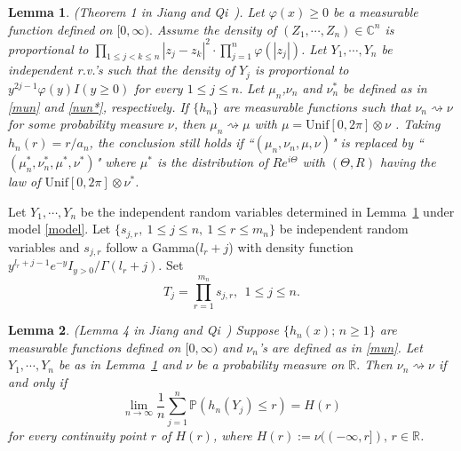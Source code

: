 \documentclass[11pt]{article}
\newtheorem{lemma}{\textbf{Lemma}}[section]
\numberwithin{equation}{section}
\begin{document}
\begin{lemma}\label{nonlinear} (Theorem 1 in Jiang and Qi~\cite{JiangQi2019}). Let $\varphi(x)\geq 0$ be a measurable  function defined on $[0, \infty).$ Assume the density  of $(Z_1, \cdots, Z_n)\in \mathbb{C}^n$ is proportional to  $\prod_{1\leq j < k
\leq n}|z_j-z_k|^2\cdot \prod_{j=1}^n\varphi(|z_j|)$. Let $Y_1,
\cdots, Y_n$ be independent r.v.'s such that the density of $Y_j$ is
proportional to  $y^{2j-1}\varphi(y)I(y\geq 0)$ for every $1\leq
j\leq n.$ Let $\mu_n$,$\nu_n$ and $\nu_n^*$ be defined as in
\eqref{mun} and \eqref{nun*}, respectively. If $\{h_n\}$ are
measurable functions such that $\nu_n\rightsquigarrow\nu$ for some
probability measure $\nu$, then $\mu_n \rightsquigarrow \mu$ with
$\mu=\mathrm{Unif}[0, 2\pi]\otimes\nu$ .
Taking $h_n(r)=r/a_n$, the conclusion still holds if ``$(\mu_n,
\nu_n, \mu, \nu)$" is replaced by  ``$(\mu_n^*, \nu_n^*, \mu^*,
\nu^*)$" where $\mu^*$ is the distribution of $Re^{i\Theta}$ with
$(\Theta, R)$ having the law of  $\mathrm{Unif}[0,
2\pi]\otimes\nu^*$.
\end{lemma}


Let $Y_1, \cdots, Y_n$ be the independent random variables
determined in Lemma~\ref{nonlinear} under model \eqref{model}. Let
$\{s_{j,r}, ~1 \leq j \leq n,~ 1 \leq r \leq m_n\}$ be independent
random variables and $s_{j,r}$ follow a Gamma($l_r+j$) with density
function $y^{l_{r}+j-1} e^{-y} I_{y>0} /
\Gamma\left(l_{r}+j\right)$. Set
\begin{equation}\label{Tj}
 T_{j}=\prod_{r=1}^{m_n} s_{j, r}, ~~ 1 \leq j \leq n.
\end{equation}


\begin{lemma}\label{lemJQ} (Lemma 4 in Jiang and Qi~\cite{JiangQi2019})
Suppose $\{h_n(x);\, n\geq 1\}$ are measurable functions defined on
$[0,\infty)$ and $\nu_n$'s are defined as in \eqref{mun}. Let $Y_1,
\cdots, Y_n$ be as in Lemma~\ref{nonlinear} and $\nu$ be a
probability measure on $\mathbb{R}.$ Then $\nu_n\rightsquigarrow\nu$
if and only if
 \[
\lim_{n\to\infty}\frac{1}{n}\sum^n_{j=1}\mathbb{P}(h_n(Y_j)\le
r)=H(r)
\]
for every continuity point $r$ of $H(r)$, where $H(r):=\nu((-\infty,
r]),\, r \in \mathbb{R}$.
\end{lemma}
\end{document}
